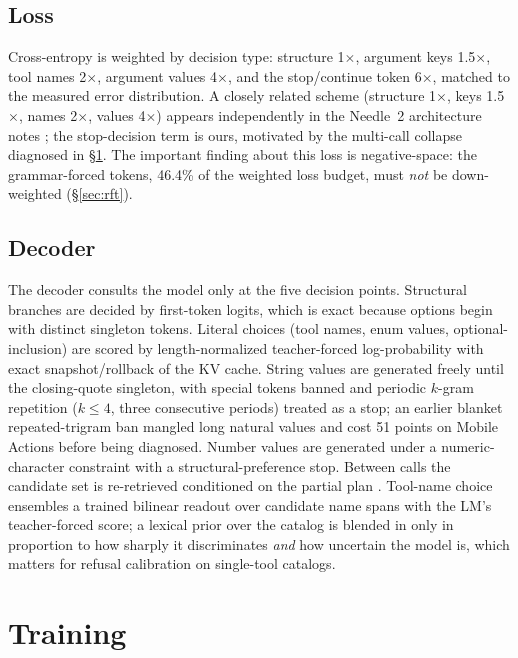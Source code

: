 \documentclass[10pt]{article}
\newcommand{\needle}{Needle~2}
\begin{document}
\subsection{Loss}

Cross-entropy is weighted by decision type: structure 1$\times$, argument keys
1.5$\times$, tool names 2$\times$, argument values 4$\times$, and the
stop/continue token 6$\times$, matched to the measured error distribution. A
closely related scheme (structure 1$\times$, keys 1.5$\times$, names
2$\times$, values 4$\times$) appears independently in the \needle{}
architecture notes \citep{san}; the stop-decision term is ours, motivated by
the multi-call collapse diagnosed in \S\ref{sec:training}. The important
finding about this loss is negative-space: the grammar-forced tokens, 46.4\%
of the weighted loss budget, must \emph{not} be down-weighted
(\S\ref{sec:rft}).

\subsection{Decoder}

The decoder consults the model only at the five decision points.
Structural branches are decided by first-token logits, which is exact because
options begin with distinct singleton tokens. Literal choices (tool names,
enum values, optional-inclusion) are scored by length-normalized
teacher-forced log-probability with exact snapshot/rollback of the KV cache.
String values are generated freely until the closing-quote singleton, with
special tokens banned and periodic $k$-gram repetition ($k\le4$, three
consecutive periods) treated as a stop; an earlier blanket repeated-trigram
ban mangled long natural values and cost 51 points on Mobile Actions before
being diagnosed. Number values are generated under a numeric-character
constraint with a structural-preference stop. Between calls the candidate set
is re-retrieved conditioned on the partial plan \citep{dtdr}. Tool-name choice
ensembles a trained bilinear readout over candidate name spans \citep{lnp}
with the LM's teacher-forced score; a lexical prior over the catalog is
blended in only in proportion to how sharply it discriminates \emph{and} how
uncertain the model is, which matters for refusal calibration on single-tool
catalogs.

\section{Training}
\label{sec:training}
\end{document}

